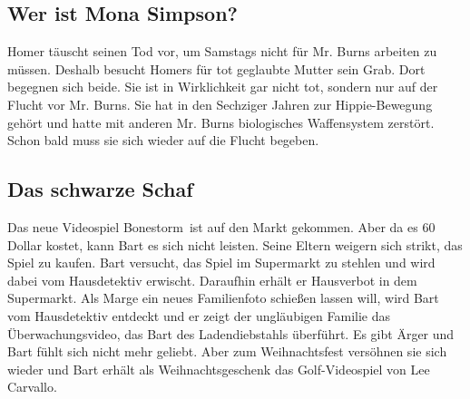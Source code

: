 	
\subsection{Wer ist Mona Simpson?}\label{3F06}
Homer täuscht seinen Tod vor, um Samstags nicht für Mr. Burns arbeiten zu müssen. Deshalb besucht Homers für tot geglaubte Mutter sein Grab. Dort begegnen sich beide. Sie ist in Wirklichkeit gar nicht tot, sondern nur auf der Flucht vor Mr. Burns. Sie hat in den Sechziger Jahren zur Hippie-Bewegung gehört und hatte mit anderen Mr. Burns biologisches Waffensystem zerstört. Schon bald muss sie sich wieder auf die Flucht begeben.


	
\subsection{Das schwarze Schaf}\label{3F07}
Das neue Videospiel \glqq Bonestorm\grqq\ ist auf den Markt gekommen. Aber da es 60 Dollar kostet, kann Bart es sich nicht leisten. Seine Eltern weigern sich strikt, das Spiel zu kaufen. Bart versucht, das Spiel im Supermarkt zu stehlen und wird dabei vom Hausdetektiv erwischt. Daraufhin erhält er Hausverbot in dem Supermarkt. Als Marge ein neues Familienfoto schießen lassen will, wird Bart vom Hausdetektiv entdeckt und er zeigt der ungläubigen Familie das Überwachungsvideo, das Bart des Ladendiebstahls überführt. Es gibt Ärger und Bart fühlt sich nicht mehr geliebt. Aber zum Weihnachtsfest versöhnen sie sich wieder und Bart erhält als Weihnachtsgeschenk das Golf-Videospiel von Lee Carvallo.

